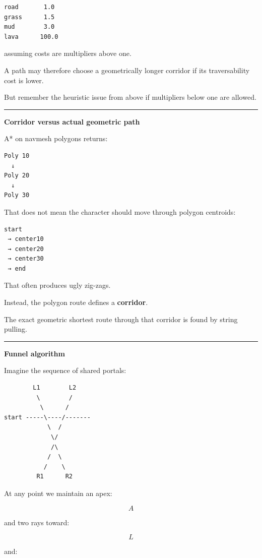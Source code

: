 \begin{verbatim}
road       1.0
grass      1.5
mud        3.0
lava      100.0
\end{verbatim}

assuming costs are multipliers above one.

A path may therefore choose a geometrically longer corridor if its traversability cost is lower.

But remember the heuristic issue from above if multipliers below one are allowed.

\begin{center}\rule{0.5\linewidth}{0.5pt}\end{center}

\textbf{Corridor versus actual geometric path}

A* on navmesh polygons returns:

\begin{verbatim}
Poly 10
  ↓
Poly 20
  ↓
Poly 30
\end{verbatim}

That does not mean the character should move through polygon centroids:

\begin{verbatim}
start
 → center10
 → center20
 → center30
 → end
\end{verbatim}

That often produces ugly zig-zags.

Instead, the polygon route defines a \textbf{corridor}.

The exact geometric shortest route through that corridor is found by string pulling.

\begin{center}\rule{0.5\linewidth}{0.5pt}\end{center}

\textbf{Funnel algorithm}

Imagine the sequence of shared portals:

\begin{verbatim}
        L1        L2
         \        /
          \      /
start -----\----/-------
            \  /
             \/
             /\
            /  \
           /    \
         R1      R2
\end{verbatim}

At any point we maintain an apex:

\[
A
\]

and two rays toward:

\[
L
\]

and:

